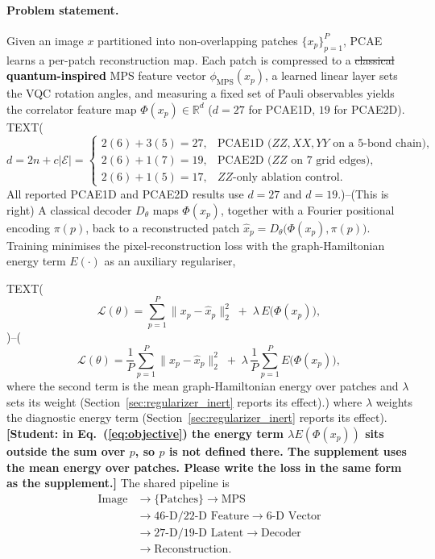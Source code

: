\documentclass[pdflatex,sn-basic]{sn-jnl}
\newcommand{\del}[1]{\sout{#1}}
\newcommand{\add}[1]{\textbf{\textcolor{black}{#1}}}
\begin{document}
\paragraph{Problem statement.}
Given an image $x$ partitioned into non-overlapping patches
$\{x_p\}_{p=1}^{P}$, PCAE learns a per-patch reconstruction map. Each patch is
compressed to a \del{classical} \add{quantum-inspired} MPS feature vector $\phi_{\mathrm{MPS}}(x_p)$, a learned
linear layer sets the VQC rotation angles, and measuring a fixed set of Pauli
observables yields the correlator feature map
$\Phi(x_p)\in\mathbb{R}^{d}$ ($d=27$ for PCAE1D, $19$ for PCAE2D). 
TEXT({\color{red}%
\begin{equation}
  \label{eq:obs_dim}
  d=2n+c\lvert\mathcal{E}\rvert=
  \begin{cases}
    2(6)+3(5)=27, & \text{PCAE1D ($ZZ,XX,YY$ on a 5-bond chain)},\\
    2(6)+1(7)=19, & \text{PCAE2D ($ZZ$ on 7 grid edges)},\\
    2(6)+1(5)=17, & \text{$ZZ$-only ablation control}.
  \end{cases}
\end{equation}
All reported PCAE1D and PCAE2D results use $d=27$ and $d=19$.})--(This is right)
A classical
decoder $D_\theta$ maps $\Phi(x_p)$, together with a Fourier positional encoding
$\pi(p)$, back to a reconstructed patch $\hat{x}_p=D_\theta\!\big(\Phi(x_p),\pi(p)\big)$.
Training minimises the pixel-reconstruction loss with the graph-Hamiltonian energy
term $E(\cdot)$ as an auxiliary regulariser,

TEXT(\begin{equation}
  \label{eq:objective}
  \mathcal{L}(\theta)=\sum_{p=1}^{P}\big\|x_p-\hat{x}_p\big\|_2^{2}
  \;+\;\lambda\,E\big(\Phi(x_p)\big),
\end{equation} )--(\begin{equation}
  \label{eq:objective}
  \mathcal{L}(\theta)=\frac{1}{P}\sum_{p=1}^{P}\big\|x_p-\hat{x}_p\big\|_2^{2}
  \;+\;\lambda\,\frac{1}{P}\sum_{p=1}^{P}E\big(\Phi(x_p)\big),
\end{equation}
where the second term is the mean graph-Hamiltonian energy over patches and
$\lambda$ sets its weight (Section~\ref{sec:regularizer_inert} reports its
effect).)
where $\lambda$ weights the diagnostic energy term (Section~\ref{sec:regularizer_inert}
reports its effect). {\color{red}\textbf{[Student: in Eq.~(\ref{eq:objective})
the energy term $\lambda E(\Phi(x_p))$ sits outside the sum over $p$, so $p$ is
not defined there. The supplement uses the mean energy over patches. Please
write the loss in the same form as the supplement.]}} The shared pipeline is
\begin{equation}
\begin{aligned}
\text{Image}
  &\rightarrow \{\text{Patches}\} \rightarrow \text{MPS}\\
  &\rightarrow \text{46-D/22-D Feature} \rightarrow \text{6-D Vector}\\
  &\rightarrow \text{27-D/19-D Latent} \rightarrow \text{Decoder}\\
  &\rightarrow \text{Reconstruction}.
\end{aligned}
\end{equation}
\end{document}
